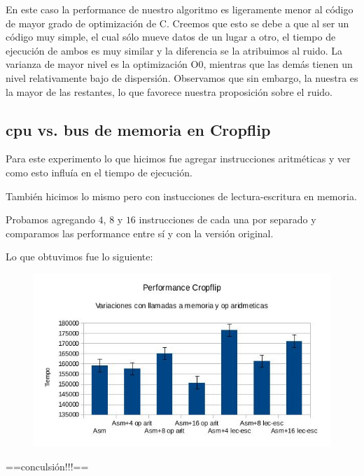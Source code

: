 \documentclass[a4paper]{article}
\begin{document}
En este caso la performance de nuestro algoritmo es ligeramente menor al código de mayor grado de optimización de C. Creemos que esto se debe a que al ser un código muy simple, el cual sólo mueve datos de un lugar a otro, el tiempo de ejecución de ambos es muy similar y la diferencia se la atribuimos al ruido. La varianza de mayor nivel es la optimización O0, mientras que las demás tienen un nivel relativamente bajo de dispersión. Observamos que sin embargo, la nuestra es la mayor de las restantes, lo que favorece nuestra proposición sobre el ruido.

\newpage

\subsection{cpu vs. bus de memoria en Cropflip}

Para este experimento lo que hicimos fue agregar instrucciones aritméticas y ver como esto influía en el tiempo de ejecución.

También hicimos lo mismo pero con instucciones de lectura-escritura en memoria. 

Probamos agregando $4$, $8$ y $16$ instrucciones de cada una por separado y comparamos las performance entre sí y con la versión original.

Lo que obtuvimos fue lo siguiente:

\begin{figure}[h!]
  \begin{center}
  \includegraphics[scale=0.66]{Graficos1.5/crop/per.jpg}
  \label{nombreparareferenciar1}
  \end{center}
\end{figure}

==conculsión!!!==

\newpage
\end{document}
